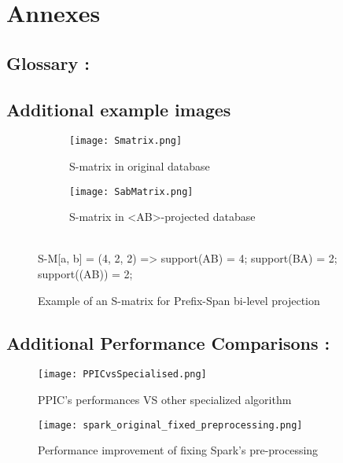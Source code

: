 \documentclass{eplmastersthesis}
\begin{document}
\clearpage
\nocite{*}



\clearpage
\section{Annexes}

\subsection{Glossary :}

\printglossary[type=\acronymtype]

\subsection{Additional example images}

\begin{figure*}[h]
  \centering
  \begin{subfigure}[t]{0.5\textwidth}
  	\centering
    \texttt{[image: Smatrix.png]}
    \caption{S-matrix in original database}
  \end{subfigure}
  \begin{subfigure}[t]{0.49\textwidth}
  	\centering
    \texttt{[image: SabMatrix.png]}
    \caption{S-matrix in <AB>-projected database}
  \end{subfigure}
  \vspace{5px} \\
  S-M[a, b] = (4, 2, 2) => support(AB) = 4; support(BA) = 2; support((AB)) = 2;
  \caption{Example of an S-matrix for Prefix-Span bi-level projection}
  \label{fig:smatrix}
\end{figure*}

\subsection{Additional Performance Comparisons :}

\begin{figure}[h]
  \centering
  \texttt{[image: PPICvsSpecialised.png]}
  \caption{PPIC's performances VS other specialized algorithm}
  \label{fig:PPICvsOther}
\end{figure}

\begin{figure}[h]
  \centering
  \texttt{[image: spark\_original\_fixed\_preprocessing.png]}
  \caption{Performance improvement of fixing Spark's pre-processing}
  \label{fig:spark_preprocessing_fix}
\end{figure}
\end{document}

